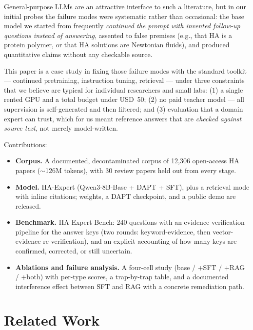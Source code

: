 \documentclass[11pt]{article}
\begin{document}
General-purpose LLMs are an attractive interface to such a literature, but
in our initial probes the failure modes were systematic rather than
occasional: the base model we started from frequently \emph{continued the
prompt with invented follow-up questions instead of answering}, assented to
false premises (e.g., that HA is a protein polymer, or that HA solutions
are Newtonian fluids), and produced quantitative claims without any
checkable source.

This paper is a case study in fixing those failure modes with the standard
toolkit --- continued pretraining, instruction tuning, retrieval --- under
three constraints that we believe are typical for individual researchers
and small labs: (1) a single rented GPU and a total budget under USD~50;
(2) no paid teacher model --- all supervision is self-generated and then
filtered; and (3) evaluation that a domain expert can trust, which for us
meant reference answers that are \emph{checked against source text}, not
merely model-written.

Contributions:
\begin{itemize}
\item \textbf{Corpus.} A documented, decontaminated corpus of 12,306
open-access HA papers ($\sim$126M tokens), with 30 review papers held out
from every stage.
\item \textbf{Model.} HA-Expert (Qwen3-8B-Base + DAPT + SFT), plus a
retrieval mode with inline citations; weights, a DAPT checkpoint, and a
public demo are released.
\item \textbf{Benchmark.} HA-Expert-Bench: 240 questions with an
evidence-verification pipeline for the answer keys (two rounds:
keyword-evidence, then vector-evidence re-verification), and an explicit
accounting of how many keys are confirmed, corrected, or still uncertain.
\item \textbf{Ablations and failure analysis.} A four-cell study
(base / +SFT / +RAG / +both) with per-type scores, a trap-by-trap table,
and a documented interference effect between SFT and RAG with a concrete
remediation path.
\end{itemize}

\section{Related Work}
\end{document}
